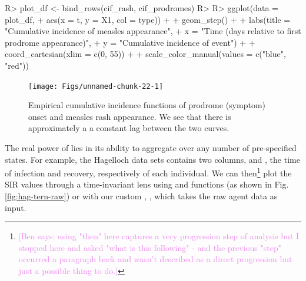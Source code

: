 \documentclass[
  shortnames]{jss}
\begin{document}
\begin{CodeChunk}
\begin{CodeInput}
R> plot_df <- bind_rows(cif_rash, cif_prodromes)
R> 
R> ggplot(data = plot_df,
+        aes(x = t, y = X1, col = type)) + 
+   geom_step() + 
+   labs(title = "Cumulative incidence of measles appearance",
+        x = "Time (days relative to first prodrome appearance)",
+        y = "Cumulative incidence of event") + 
+   coord_cartesian(xlim = c(0, 55)) +
+   scale_color_manual(values = c("blue", "red"))
\end{CodeInput}
\begin{figure}[H]

{\centering \texttt{[image: Figs/unnamed-chunk-22-1]} 

}

\caption{\label{fig:cifs}Empirical cumulative incidence functions of prodrome (symptom) onset and measles rash appearance.  We see that there is approximately a a constant lag between the two curves.}\label{fig:unnamed-chunk-22}
\end{figure}
\end{CodeChunk}

The real power of  lies in its ability to
aggregate over any number of pre-specified states. For example, the
Hagelloch data sets contains two columns,  and , the
time of infection and recovery, respectively of each individual. We can
then\footnote{\textcolor{violet}{[Ben says: using "then" here captures a very progression step of analysis but I stopped here and asked "what is this following" - and the previous "step" occurred a paragraph back and wasn't described as a direct progression but just a possible thing to do.]}}
plot the SIR values through a time-invariant lens using 
and  functions (as shown in Fig. \ref{fig:hag-tern-raw}) or
with our custom , , which takes the raw
agent data as input.
\end{document}
